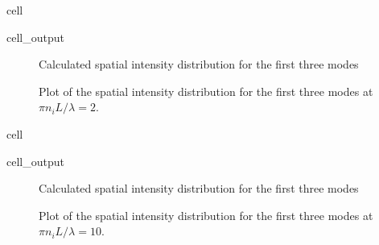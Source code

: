 \documentclass[a4paper,10pt,english,openany,oneside]{jupyterBook}
\begin{document}
\begin{sphinxuseclass}{cell}\begin{sphinxVerbatimOutput}

\begin{sphinxuseclass}{cell_output}
\begin{figure}[htbp]
\centering
\capstart

\noindent{}
\caption{Calculated spatial intensity distribution for the first three modes}\label{\detokenize{Kogelnik-Shank_Coupled-Wave-Theory_DFB-Lasers:kogelnik11cc}}\end{figure}

\end{sphinxuseclass}\end{sphinxVerbatimOutput}

\end{sphinxuseclass}
\begin{figure}[htbp]
\centering
\capstart

\noindent{}
\caption{Plot of the spatial intensity distribution for the first three modes at \(\pi n_i L/\lambda=2\).}\label{\detokenize{Kogelnik-Shank_Coupled-Wave-Theory_DFB-Lasers:kogelnik11c}}\end{figure}

\begin{sphinxuseclass}{cell}\begin{sphinxVerbatimOutput}

\begin{sphinxuseclass}{cell_output}
\begin{figure}[htbp]
\centering
\capstart

\noindent{}
\caption{Calculated spatial intensity distribution for the first three modes}\label{\detokenize{Kogelnik-Shank_Coupled-Wave-Theory_DFB-Lasers:kogelnik11dc}}\end{figure}

\end{sphinxuseclass}\end{sphinxVerbatimOutput}

\end{sphinxuseclass}
\begin{figure}[htbp]
\centering
\capstart

\noindent{}
\caption{Plot of the spatial intensity distribution for the first three modes at \(\pi n_i L/\lambda=10\).}\label{\detokenize{Kogelnik-Shank_Coupled-Wave-Theory_DFB-Lasers:kogelnik11d}}\end{figure}
\end{document}
